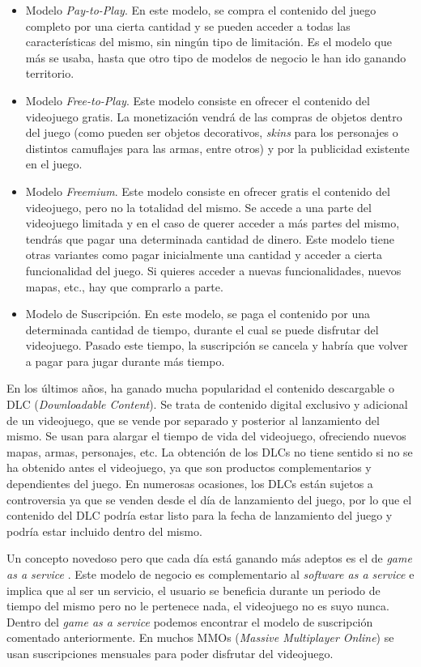\begin{itemize}
\item Modelo \textit{Pay-to-Play}. En este modelo, se compra el contenido del juego completo por una cierta cantidad y se pueden acceder a todas las características del mismo, sin ningún tipo de limitación. Es el modelo que más se usaba, hasta que otro tipo de modelos de negocio le han ido ganando territorio.
\item Modelo \textit{Free-to-Play}. Este modelo consiste en ofrecer el contenido del videojuego gratis. La monetización vendrá de las compras de objetos dentro del juego (como pueden ser objetos decorativos, \textit{skins} para los personajes o distintos camuflajes para las armas, entre otros) y por la publicidad existente en el juego.
\item Modelo \textit{Freemium}. Este modelo consiste en ofrecer gratis el contenido del videojuego, pero no la totalidad del mismo. Se accede a una parte del videojuego limitada y en el caso de querer acceder a más partes del mismo, tendrás que pagar una determinada cantidad de dinero. Este modelo tiene otras variantes como pagar inicialmente una cantidad y acceder a cierta funcionalidad del juego. Si quieres acceder a nuevas funcionalidades, nuevos mapas, etc., hay que comprarlo a parte.
\item Modelo de Suscripción. En este modelo, se paga el contenido por una determinada cantidad de tiempo, durante el cual se puede disfrutar del videojuego. Pasado este tiempo, la suscripción se cancela y habría que volver a pagar para jugar durante más tiempo.
\end{itemize}

En los últimos años, ha ganado mucha popularidad el contenido descargable o DLC (\textit{Downloadable Content}). Se trata de contenido digital exclusivo y adicional de un videojuego, que se vende por separado y posterior al lanzamiento del mismo. Se usan para alargar el tiempo de vida del videojuego, ofreciendo nuevos mapas, armas, personajes, etc. La obtención de los DLCs no tiene sentido si no se ha obtenido antes el videojuego, ya que son productos complementarios y dependientes del juego. En numerosas ocasiones, los DLCs están sujetos a controversia ya que se venden desde el día de lanzamiento del juego, por lo que el contenido del DLC podría estar listo para la fecha de lanzamiento del juego y podría estar incluido dentro del mismo.

Un concepto novedoso pero que cada día está ganando más adeptos es el de \textit{game as a service} \cite{11}. Este modelo de negocio es complementario al \textit{software as a service} e implica que al ser un servicio, el usuario se beneficia durante un periodo de tiempo del mismo pero no le pertenece nada, el videojuego no es suyo nunca. Dentro del \textit{game as a service} podemos encontrar el modelo de suscripción comentado anteriormente. En muchos MMOs (\textit{Massive Multiplayer Online}) se usan suscripciones mensuales para poder disfrutar del videojuego.


